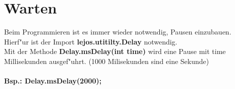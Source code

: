 \section{Warten}
	Beim Programmieren ist es immer wieder notwendig, Pausen einzubauen.\\
	Hierf"ur ist der Import \textbf{lejos.utitilty.Delay} notwendig.\\
	Mit der Methode \textbf{Delay.msDelay(int time)} wird eine Pause mit \glqq time \grqq{} Millisekunden ausgef"uhrt. (1000 Milisekunden sind eine Sekunde)\\ \\
	\textbf{Bsp.: Delay.msDelay(2000);}
	
	